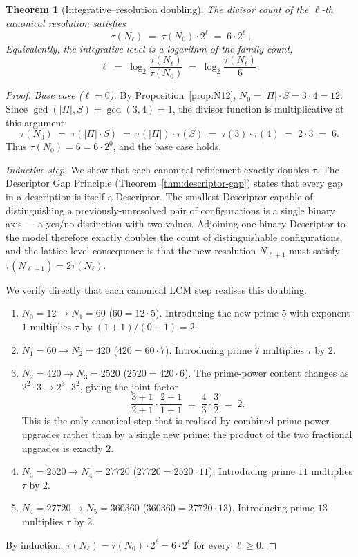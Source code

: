 \documentclass[11pt,a4paper]{article}
\newtheorem{theorem}{Theorem}[section]
\theoremstyle{definition}
\theoremstyle{remark}
\begin{document}
\begin{theorem}[Integrative--resolution doubling]\label{thm:doubling}
The divisor count of the $\ell$-th canonical resolution satisfies
\begin{equation}\label{eq:doubling}
\boxed{\;\tau(N_{\ell}) \;=\; \tau(N_{0})\cdot 2^{\ell} \;=\; 6\cdot 2^{\ell}\;.}
\end{equation}
Equivalently, the integrative level is a logarithm of the family count,
\begin{equation}\label{eq:level-log}
\ell \;=\; \log_{2}\!\frac{\tau(N_{\ell})}{\tau(N_{0})} \;=\; \log_{2}\!\frac{\tau(N_{\ell})}{6}.
\end{equation}
\end{theorem}

\begin{proof}
\emph{Base case ($\ell=0$).} By Proposition~\ref{prop:N12}, $N_{0} = |\Pi|\cdot S = 3\cdot 4 = 12$. Since $\gcd(|\Pi|, S) = \gcd(3,4) = 1$, the divisor function is multiplicative at this argument:
\[
\tau(N_{0}) \;=\; \tau(|\Pi|\cdot S) \;=\; \tau(|\Pi|)\cdot \tau(S) \;=\; \tau(3)\cdot \tau(4) \;=\; 2\cdot 3 \;=\; 6.
\]
Thus $\tau(N_{0}) = 6 = 6\cdot 2^{0}$, and the base case holds.

\emph{Inductive step.} We show that each canonical refinement exactly doubles $\tau$. The Descriptor Gap Principle (Theorem~\ref{thm:descriptor-gap}) states that every gap in a description is itself a Descriptor. The smallest Descriptor capable of distinguishing a previously-unresolved pair of configurations is a single binary axis --- a yes/no distinction with two values. Adjoining one binary Descriptor to the model therefore exactly doubles the count of distinguishable configurations, and the lattice-level consequence is that the new resolution $N_{\ell+1}$ must satisfy $\tau(N_{\ell+1}) = 2\tau(N_{\ell})$.

We verify directly that each canonical LCM step realises this doubling.
\begin{enumerate}[leftmargin=*]
\item \emph{$N_{0}=12 \to N_{1}=60$} ($60 = 12\cdot 5$). Introducing the new prime $5$ with exponent $1$ multiplies $\tau$ by $(1+1)/(0+1) = 2$.
\item \emph{$N_{1}=60 \to N_{2}=420$} ($420 = 60\cdot 7$). Introducing prime $7$ multiplies $\tau$ by $2$.
\item \emph{$N_{2}=420 \to N_{3}=2520$} ($2520 = 420 \cdot 6$). The prime-power content changes as $2^{2}\cdot 3 \to 2^{3}\cdot 3^{2}$, giving the joint factor
\[
\frac{3+1}{2+1}\cdot\frac{2+1}{1+1} \;=\; \frac{4}{3}\cdot\frac{3}{2} \;=\; 2.
\]
This is the only canonical step that is realised by combined prime-power upgrades rather than by a single new prime; the product of the two fractional upgrades is exactly $2$.
\item \emph{$N_{3}=2520 \to N_{4}=27720$} ($27720 = 2520\cdot 11$). Introducing prime $11$ multiplies $\tau$ by $2$.
\item \emph{$N_{4}=27720 \to N_{5}=360360$} ($360360 = 27720\cdot 13$). Introducing prime $13$ multiplies $\tau$ by $2$.
\end{enumerate}
By induction, $\tau(N_{\ell}) = \tau(N_{0})\cdot 2^{\ell} = 6\cdot 2^{\ell}$ for every $\ell\ge 0$.


\end{proof}
\end{document}
